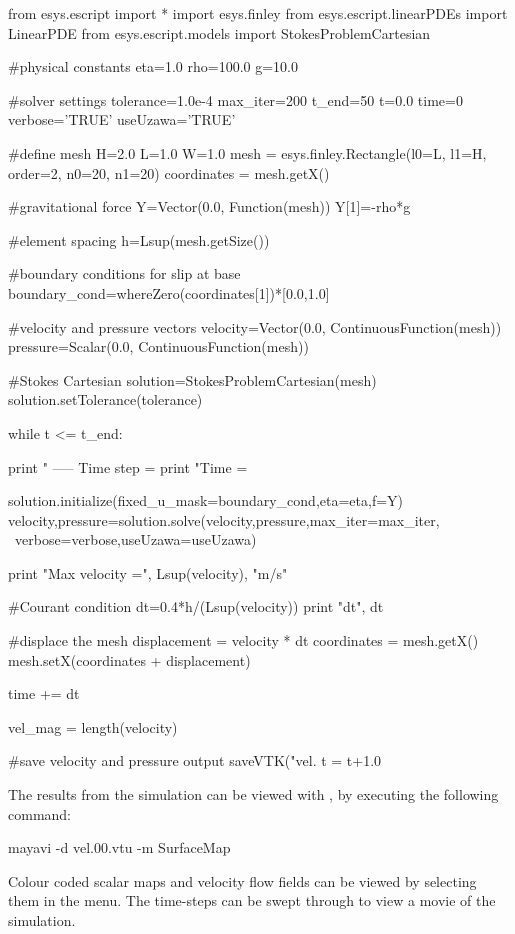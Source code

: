 \begin{python}
from esys.escript import *
import esys.finley
from esys.escript.linearPDEs import LinearPDE
from esys.escript.models import StokesProblemCartesian

#physical constants
eta=1.0
rho=100.0
g=10.0 

#solver settings
tolerance=1.0e-4
max_iter=200
t_end=50
t=0.0
time=0
verbose='TRUE'
useUzawa='TRUE'

#define mesh 
H=2.0
L=1.0
W=1.0
mesh = esys.finley.Rectangle(l0=L, l1=H, order=2, n0=20, n1=20)
coordinates = mesh.getX()

#gravitational force
Y=Vector(0.0, Function(mesh))
Y[1]=-rho*g

#element spacing
h=Lsup(mesh.getSize())

#boundary conditions for slip at base
boundary_cond=whereZero(coordinates[1])*[0.0,1.0]

#velocity and pressure vectors
velocity=Vector(0.0, ContinuousFunction(mesh))
pressure=Scalar(0.0, ContinuousFunction(mesh))

#Stokes Cartesian
solution=StokesProblemCartesian(mesh)
solution.setTolerance(tolerance)

while t <= t_end:

  print " ----- Time step = %
  print "Time = %
 
  solution.initialize(fixed_u_mask=boundary_cond,eta=eta,f=Y)
  velocity,pressure=solution.solve(velocity,pressure,max_iter=max_iter, \
  verbose=verbose,useUzawa=useUzawa)
  
  print "Max velocity =", Lsup(velocity), "m/s"
  
  #Courant condition
  dt=0.4*h/(Lsup(velocity))
  print "dt", dt 
  
  #displace the mesh
  displacement = velocity * dt
  coordinates = mesh.getX()
  mesh.setX(coordinates + displacement)  
  
  time += dt
  
  vel_mag = length(velocity)

  #save velocity and pressure output
  saveVTK("vel.%
  t = t+1.0

\end{python}
%
The results from the simulation can be viewed with \mayavi, by executing the following command:
%
\begin{python}
mayavi -d vel.00.vtu -m SurfaceMap
\end{python}
%
Colour coded scalar maps and velocity flow fields can be viewed by selecting them in the menu. The time-steps can be swept through to view a movie of the simulation.
